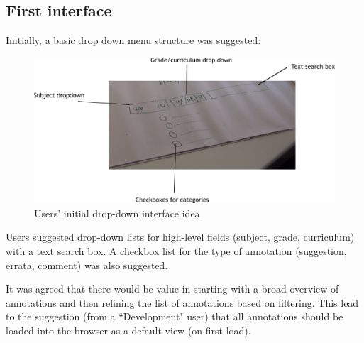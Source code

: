 \subsection{First interface}
Initially, a basic drop down menu structure was suggested:
\begin{figure}[h!]
    \centering
    \includegraphics[width=\textwidth]{Figures/PD1shot2labels.png}
 \caption{Users' initial drop-down interface idea}
\end{figure}

Users suggested drop-down lists for high-level fields (subject, grade, curriculum) with a text search box. A checkbox list for the type of annotation (suggestion, errata, comment) was also suggested.

It was agreed that there would be value in starting with a broad overview of annotations and then refining the list of annotations based on filtering. This lead to the suggestion (from a ``Development" user) that all annotations should be loaded into the browser as a default view (on first load).


